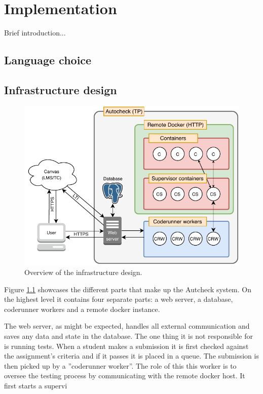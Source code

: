 \chapter{Implementation}

Brief introduction...

\section{Language choice}



\section{Infrastructure design}

\begin{figure}
    \centering
    \includegraphics{figure/Infrastructure.pdf}
    \caption{Overview of the infrastructure design.}
    \label{fig:infrastructure_design}
\end{figure}

Figure \ref{fig:infrastructure_design} showcases the different parts that make up the Autcheck system. On the highest level it contains four separate parts: a web server, a database, coderunner workers and a remote docker instance.

The web server, as might be expected, handles all external communication and saves any data and state in the database. The one thing it is not responsible for is running tests. When a student makes a submission it is first checked against the assignment's criteria and if it passes it is placed in a queue. The submission is then picked up by a ''coderunner worker''. The role of this this worker is to oversee the testing process by communicating with the remote docker host. It first starts a supervi 


